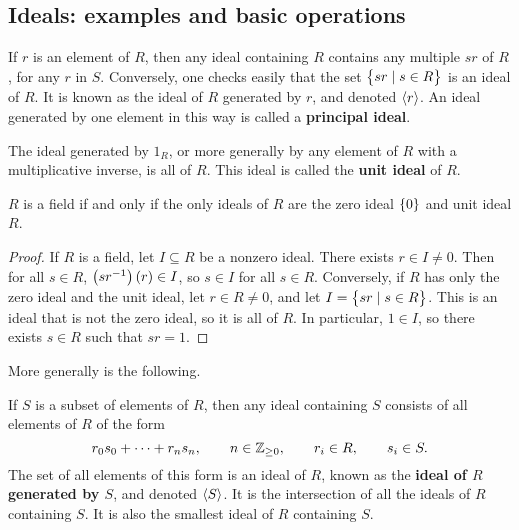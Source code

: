 \pagebreak

\subsection{Ideals: examples and basic operations}

If $ r $ is an element of $ R $, then any ideal containing $ R $ contains any multiple $ sr $ of $ R $, for any $ r $ in $ S $. Conversely, one checks easily that the set $ \cbr{sr \mid s \in R} $ is an ideal of $ R $. It is known as the ideal of $ R $ generated by $ r $, and denoted $ \left\langle r \right\rangle $. An ideal generated by one element in this way is called a \textbf{principal ideal}.

\begin{note*}
The ideal generated by $ 1_R $, or more generally by any element of $ R $ with a multiplicative inverse, is all of $ R $. This ideal is called the \textbf{unit ideal} of $ R $.
\end{note*}

\begin{proposition}
$ R $ is a field if and only if the only ideals of $ R $ are the zero ideal $ \cbr{0} $ and unit ideal $ R $.
\end{proposition}

\begin{proof}
If $ R $ is a field, let $ I \subseteq R $ be a nonzero ideal. There exists $ r \in I \ne 0 $. Then for all $ s \in R $, $ \br{sr^{-1}}\br{r} \in I $, so $ s \in I $ for all $ s \in R $. Conversely, if $ R $ has only the zero ideal and the unit ideal, let $ r \in R \ne 0 $, and let $ I = \cbr{sr \mid s \in R} $. This is an ideal that is not the zero ideal, so it is all of $ R $. In particular, $ 1 \in I $, so there exists $ s \in R $ such that $ sr = 1 $.
\end{proof}

More generally is the following.

\begin{definition}
If $ S $ is a subset of elements of $ R $, then any ideal containing $ S $ consists of all elements of $ R $ of the form
$$ r_0s_0 + \dots + r_ns_n, \qquad n \in \mathbb{Z}_{\ge 0}, \qquad r_i \in R, \qquad s_i \in S. $$
The set of all elements of this form is an ideal of $ R $, known as the \textbf{ideal of $ R $ generated by $ S $}, and denoted $ \left\langle S \right\rangle $. It is the intersection of all the ideals of $ R $ containing $ S $. It is also the smallest ideal of $ R $ containing $ S $.
\end{definition}

